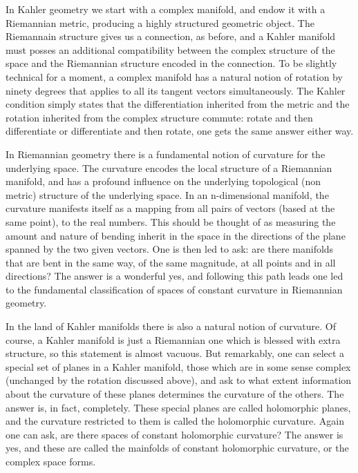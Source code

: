 \documentclass[11pt]{amsart}
\theoremstyle{definition}
\theoremstyle{definition}
\begin{document}
In Kahler geometry we start with a complex manifold, and endow it with a Riemannian metric, producing a highly structured geometric object.  The Riemannain structure gives us a connection, as before, and a Kahler manifold must posses an additional compatibility between the complex structure of the space and the Riemannian structure encoded in the connection.  To be slightly technical for a moment, a complex manifold has a natural notion of rotation by ninety degrees that applies to all its tangent vectors simultaneously.  The Kahler condition simply states that the differentiation inherited from the metric and the rotation inherited from the complex structure commute: rotate and then differentiate or differentiate and then rotate, one gets the same answer either way.

In Riemannian geometry there is a fundamental notion of curvature for the underlying space.  The curvature encodes the local structure of a Riemannian manifold, and has a profound influence on the underlying topological (non metric) structure of the underlying space.  In an n-dimensional manifold, the curvature manifests itself as a mapping from all pairs of vectors (based at the same point), to the real numbers.  This should be thought of as measuring the amount and nature of bending inherit in the space in the directions of the plane spanned by the two given vectors.  One is then led to ask: are there manifolds that are bent in the same way, of the same magnitude, at all points and in all directions?  The answer is a wonderful yes, and following this path leads one led to the fundamental classification of spaces of constant curvature in Riemannian geometry.  

In the land of Kahler manifolds there is also a natural notion of curvature.  Of course, a Kahler manifold is just a Riemannian one which is blessed with extra structure, so this statement is almost vacuous.  But remarkably, one can select a special set of planes in a Kahler manifold, those which are in some sense complex (unchanged by the rotation discussed above), and ask to what extent information about the curvature of these planes determines the curvature of the others.  The answer is, in fact, completely.  These special planes are called holomorphic planes, and the curvature restricted to them is called the holomorphic curvature.  Again one can ask, are there spaces of constant holomorphic curvature?  The answer is yes, and these are called the mainfolds of constant holomorphic curvature, or the complex space forms.
\end{document}
